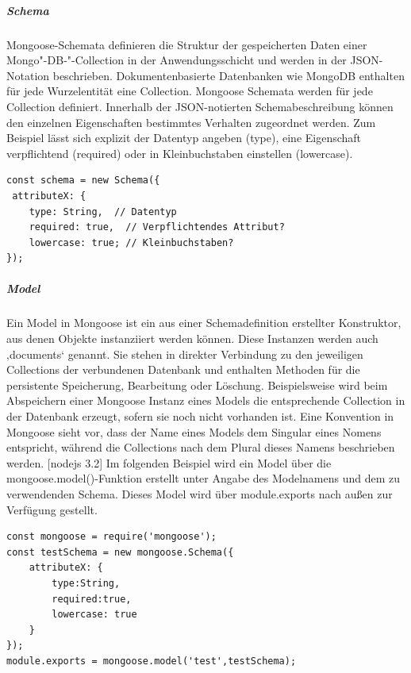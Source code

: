 \subparagraph{Schema}
Mongoose-Schemata definieren die Struktur der gespeicherten Daten einer Mongo"-DB-"-Collection in der Anwendungsschicht und werden in der JSON-Notation beschrieben. Dokumentenbasierte Datenbanken wie MongoDB enthalten für jede Wurzelentität eine Collection. Mongoose Schemata werden für jede Collection definiert. Innerhalb der JSON-notierten Schemabeschreibung können den einzelnen Eigenschaften bestimmtes Verhalten zugeordnet werden. Zum Beispiel lässt sich explizit der Datentyp angeben (type), eine Eigenschaft verpflichtend (required) oder in Kleinbuchstaben einstellen (lowercase).
\newline


\begin{lstlisting}[caption=Mongoose Schema - Beispiel,label=lst:MongooseSchema]
const schema = new Schema({
 attributeX: {
 	type: String,  // Datentyp
 	required: true,  // Verpflichtendes Attribut?
 	lowercase: true; // Kleinbuchstaben?
});
\end{lstlisting}

\newpage
\subparagraph{Model}
Ein Model in Mongoose ist ein aus einer Schemadefinition erstellter Konstruktor, aus denen Objekte instanziiert werden können. Diese Instanzen werden auch ‚documents‘ genannt. Sie stehen in direkter Verbindung zu den jeweiligen Collections der verbundenen Datenbank und enthalten Methoden für die persistente Speicherung, Bearbeitung oder Löschung. Beispielsweise wird beim Abspeichern einer Mongoose Instanz eines Models die entsprechende Collection in der Datenbank erzeugt, sofern sie noch nicht vorhanden ist. Eine Konvention in Mongoose sieht vor, dass der Name eines Models dem Singular eines Nomens entspricht, während die Collections nach dem Plural dieses Namens beschrieben werden. [nodejs 3.2] Im folgenden Beispiel wird ein Model über die mongoose.model()-Funktion erstellt unter Angabe des Modelnamens und dem zu verwendenden Schema. Dieses Model wird über module.exports nach außen zur Verfügung gestellt.

\begin{lstlisting}[caption=Model erstellen und exportierenn,label=lst:MongooseObjectExport]
const mongoose = require('mongoose');
const testSchema = new mongoose.Schema({
	attributeX: {
		type:String,
		required:true,
		lowercase: true
	}
});
module.exports = mongoose.model('test',testSchema);
\end{lstlisting}

